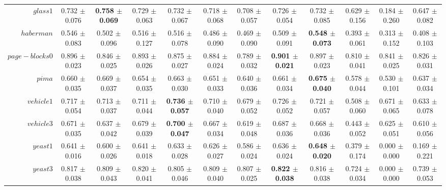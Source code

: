 \begin{table}[!ht]
{\begin{tabular}{r c c c c c c c c c c c}
$glass1$ & 0.732 $\pm$ 0.076 & \textbf{0.758 $\pm$ 0.069} & 0.729 $\pm$ 0.063 & 0.732 $\pm$ 0.067 & 0.718 $\pm$ 0.068 & 0.708 $\pm$ 0.057 & 0.726 $\pm$ 0.054 & 0.732 $\pm$ 0.085 & 0.629 $\pm$ 0.156 & 0.184 $\pm$ 0.260 & 0.647 $\pm$ 0.082 \\
$haberman$ & 0.546 $\pm$ 0.083 & 0.502 $\pm$ 0.096 & 0.516 $\pm$ 0.127 & 0.516 $\pm$ 0.078 & 0.486 $\pm$ 0.090 & 0.469 $\pm$ 0.090 & 0.509 $\pm$ 0.091 & \textbf{0.548 $\pm$ 0.073} & 0.393 $\pm$ 0.061 & 0.313 $\pm$ 0.152 & 0.408 $\pm$ 0.103 \\
$page-blocks0$ & 0.896 $\pm$ 0.023 & 0.846 $\pm$ 0.025 & 0.893 $\pm$ 0.026 & 0.875 $\pm$ 0.027 & 0.884 $\pm$ 0.024 & 0.789 $\pm$ 0.032 & \textbf{0.901 $\pm$ 0.021} & 0.897 $\pm$ 0.023 & 0.810 $\pm$ 0.041 & 0.841 $\pm$ 0.025 & 0.826 $\pm$ 0.031 \\
$pima$ & 0.660 $\pm$ 0.035 & 0.669 $\pm$ 0.037 & 0.654 $\pm$ 0.035 & 0.663 $\pm$ 0.030 & 0.651 $\pm$ 0.033 & 0.640 $\pm$ 0.036 & 0.661 $\pm$ 0.034 & \textbf{0.675 $\pm$ 0.040} & 0.578 $\pm$ 0.044 & 0.530 $\pm$ 0.101 & 0.637 $\pm$ 0.034 \\
$vehicle1$ & 0.717 $\pm$ 0.054 & 0.713 $\pm$ 0.037 & 0.711 $\pm$ 0.044 & \textbf{0.736 $\pm$ 0.057} & 0.710 $\pm$ 0.040 & 0.679 $\pm$ 0.052 & 0.726 $\pm$ 0.052 & 0.721 $\pm$ 0.057 & 0.508 $\pm$ 0.060 & 0.671 $\pm$ 0.065 & 0.633 $\pm$ 0.078 \\
$vehicle3$ & 0.671 $\pm$ 0.035 & 0.637 $\pm$ 0.042 & 0.679 $\pm$ 0.039 & \textbf{0.700 $\pm$ 0.047} & 0.667 $\pm$ 0.034 & 0.619 $\pm$ 0.048 & 0.687 $\pm$ 0.036 & 0.668 $\pm$ 0.036 & 0.443 $\pm$ 0.052 & 0.625 $\pm$ 0.051 & 0.610 $\pm$ 0.056 \\
$yeast1$ & 0.641 $\pm$ 0.016 & 0.600 $\pm$ 0.026 & 0.641 $\pm$ 0.018 & 0.633 $\pm$ 0.028 & 0.626 $\pm$ 0.027 & 0.586 $\pm$ 0.024 & 0.636 $\pm$ 0.024 & \textbf{0.648 $\pm$ 0.020} & 0.379 $\pm$ 0.174 & 0.000 $\pm$ 0.000 & 0.169 $\pm$ 0.221 \\
$yeast3$ & 0.817 $\pm$ 0.038 & 0.809 $\pm$ 0.043 & 0.820 $\pm$ 0.041 & 0.805 $\pm$ 0.046 & 0.809 $\pm$ 0.040 & 0.807 $\pm$ 0.025 & \textbf{0.822 $\pm$ 0.038} & 0.816 $\pm$ 0.038 & 0.724 $\pm$ 0.034 & 0.000 $\pm$ 0.000 & 0.739 $\pm$ 0.053 \\
\end{tabular}}
\end{table}
